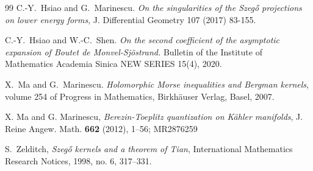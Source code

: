 \documentclass[12pt]{amsart}
\theoremstyle{definition}
\theoremstyle{named}
\numberwithin{equation}{subsection}
\begin{document}
\begin{thebibliography}{99}
	C.-Y.~Hsiao and G.~Marinescu.
	\emph{On the singularities of the Szeg\H{o} projections on lower energy forms},
	J. Differential Geometry 107 (2017) 83-155. 

C.-Y.~Hsiao and W.-C.~Shen. \emph{On the second coefficient of the asymptotic expansion of Boutet de Monvel-Sj\"ostrand.} Bulletin of the Institute of Mathematics Academia Sinica NEW SERIES 15(4), 2020.

	X.~Ma and G.~Marinescu.
	\emph{Holomorphic {M}orse inequalities and {B}ergman kernels}, volume
	254 of Progress in Mathematics, Birkh\"auser Verlag, Basel, 2007.
	 
X. Ma and G. Marinescu, \emph{Berezin-Toeplitz quantization on  
	K\"ahler manifolds}, J. Reine Angew. Math. {\bf 662} (2012), 1--56; MR2876259
	
S.~Zelditch, \emph{Szeg{\H o} kernels and a theorem of {T}ian},
International Mathematics Research Notices, 1998, no. 6, 317--331. 	

\end{thebibliography}
\end{document}
